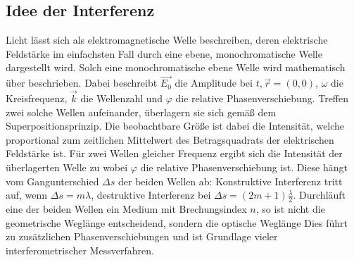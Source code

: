 \subsection[Interferenz]{Idee der Interferenz}
Licht lässt sich als elektromagnetische Welle beschreiben, deren elektrische Feldstärke im einfachsten Fall durch eine ebene, monochromatische Welle dargestellt wird. Solch eine monochromatische ebene Welle wird mathematisch über
beschrieben. Dabei beschreibt $\vec{E_0}$ die Amplitude bei $t,\vec{r} = (0, 0)$, $\omega$ die Kreisfrequenz, $\vec{k}$ die Wellenzahl und $\varphi$ die relative Phasenverschiebung.
Treffen zwei solche Wellen aufeinander, überlagern sie sich gemäß dem Superpositionsprinzip. Die beobachtbare Größe ist dabei die Intensität, welche proportional zum zeitlichen Mittelwert des Betragsquadrats der elektrischen Feldstärke ist.
Für zwei Wellen gleicher Frequenz ergibt sich die Intensität der überlagerten Welle zu
wobei \(\varphi\) die relative Phasenverschiebung ist. Diese hängt vom Gangunterschied \(\Delta s\) der beiden Wellen ab:
Konstruktive Interferenz tritt auf, wenn \(\Delta s = m\lambda\), destruktive Interferenz bei \(\Delta s = (2m+1)\frac{\lambda}{2}\).  
Durchläuft eine der beiden Wellen ein Medium mit Brechungsindex \(n\), so ist nicht die geometrische Weglänge entscheidend, sondern die optische Weglänge
Dies führt zu zusätzlichen Phasenverschiebungen und ist Grundlage vieler interferometrischer Messverfahren.


